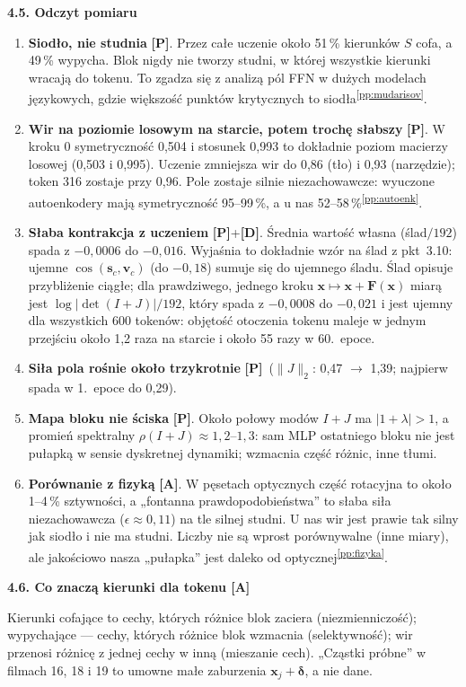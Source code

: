 \documentclass[a4paper,11pt]{article}
\newcommand{\stD}{\textcolor{dok}{\textsf{\textbf{[D]}}}}
\newcommand{\stP}{\textcolor{pom}{\textsf{\textbf{[P]}}}}
\newcommand{\stA}{\textcolor{ana}{\textsf{\textbf{[A]}}}}
\newcommand{\pp}[1]{\textsuperscript{\ref{pp:#1}}}
\newcommand{\elem}[1]{\par\medskip\noindent\textbf{#1}\par\nopagebreak}
\begin{document}
\elem{4.5. Odczyt pomiaru}
\begin{enumerate}
\item \textbf{Siodło, nie studnia} \stP. Przez całe uczenie około 51\,\% kierunków $S$ cofa, a 49\,\% wypycha. Blok nigdy nie tworzy
studni, w której wszystkie kierunki wracają do tokenu. To zgadza się z analizą pól FFN w dużych modelach językowych, gdzie większość
punktów krytycznych to siodła\pp{mudarisov}.
\item \textbf{Wir na poziomie losowym na starcie, potem trochę słabszy} \stP. W kroku 0 symetryczność 0,504 i stosunek 0,993 to dokładnie
poziom macierzy losowej (0,503 i 0,995). Uczenie zmniejsza wir do 0,86 (tło) i 0,93 (narzędzie); token 316 zostaje przy 0,96.
Pole zostaje silnie niezachowawcze: wyuczone autoenkodery mają symetryczność 95--99\,\%, a u nas 52--58\,\%\pp{autoenk}.
\item \textbf{Słaba kontrakcja z uczeniem} \stP+\stD. Średnia wartość własna (ślad$/192$) spada z $-0{,}0006$ do $-0{,}016$. Wyjaśnia to
dokładnie wzór na ślad z pkt~3.10: ujemne $\cos(\bm s_c,\bm v_c)$ (do $-0{,}18$) sumuje się do ujemnego śladu. Ślad opisuje
przybliżenie ciągłe; dla prawdziwego, jednego kroku $\bm x\mapsto\bm x+\bm F(\bm x)$ miarą jest $\log\lvert\det(I+J)\rvert/192$, który spada
z $-0{,}0008$ do $-0{,}021$ i jest ujemny dla wszystkich 600 tokenów: objętość otoczenia tokenu maleje w jednym przejściu około 1,2 raza
na starcie i około 55 razy w 60.~epoce.
\item \textbf{Siła pola rośnie około trzykrotnie} \stP\ ($\lVert J\rVert_2$: 0,47 $\to$ 1,39; najpierw spada w 1.~epoce do 0,29).
\item \textbf{Mapa bloku nie ściska} \stP. Około połowy modów $I+J$ ma $|1+\lambda|>1$, a promień spektralny $\rho(I+J)\approx1{,}2$--$1{,}3$:
sam MLP ostatniego bloku nie jest pułapką w sensie dyskretnej dynamiki; wzmacnia część różnic, inne tłumi.
\item \textbf{Porównanie z fizyką} \stA. W pęsetach optycznych część rotacyjna to około 1--4\,\% sztywności, a „fontanna
prawdopodobieństwa” to słaba siła niezachowawcza ($\epsilon\approx0{,}11$) na tle silnej studni. U nas wir jest prawie tak silny jak
siodło i nie ma studni. Liczby nie są wprost porównywalne (inne miary), ale jakościowo nasza „pułapka” jest daleko od optycznej\pp{fizyka}.
\end{enumerate}

\elem{4.6. Co znaczą kierunki dla tokenu \stA}
Kierunki cofające to cechy, których różnice blok zaciera (niezmienniczość); wypychające --- cechy, których różnice blok wzmacnia
(selektywność); wir przenosi różnicę z jednej cechy w inną (mieszanie cech). „Cząstki próbne” w filmach 16, 18 i 19 to umowne
małe zaburzenia $\bm x_j+\bm\delta$, a nie dane.
\end{document}
